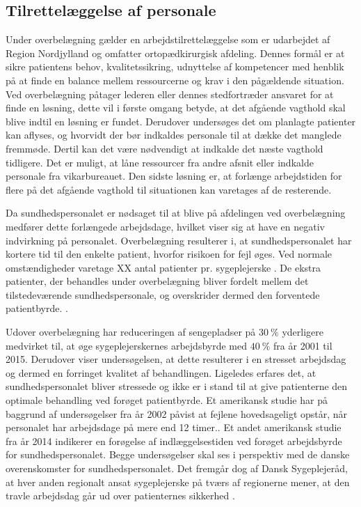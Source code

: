 \subsection{Tilrettelæggelse af personale}
Under overbelægning gælder en arbejdstilrettelæggelse som er udarbejdet af Region Nordjylland og omfatter ortopædkirurgisk afdeling. Dennes formål er at sikre patientens behov, kvalitetssikring, udnyttelse af kompetencer med henblik på at finde en balance mellem ressourcerne og krav i den pågældende situation. Ved overbelægning påtager lederen eller dennes stedfortræder ansvaret for at finde en løsning, dette vil i første omgang betyde, at det afgående vagthold skal blive indtil en løsning er fundet. Derudover undersøges det om planlagte patienter kan aflyses, og hvorvidt der bør indkaldes personale til at dække det manglede fremmøde. Dertil kan det være nødvendigt at indkalde det næste vagthold tidligere. Det er muligt, at låne ressourcer fra andre afsnit eller indkalde personale fra vikarbureauet. Den sidste løsning er, at forlænge arbejdstiden for flere på det afgående vagthold til situationen kan varetages af de resterende. \cite{Bjerg2016}


Da sundhedspersonalet er nødsaget til at blive på afdelingen ved overbelægning medfører dette forlængede arbejdsdage, hvilket viser sig at have en negativ indvirkning på personalet.\cite{Kjeldsen2015} \cite{Dinges2004} Overbelægning resulterer i, at sundhedspersonalet har kortere tid til den enkelte patient, hvorfor risikoen for fejl øges. \cite{Dinges2004} Ved normale omstændigheder varetage XX antal patienter pr. sygeplejerske . De ekstra patienter, der behandles under overbelægning bliver fordelt mellem det tilstedeværende sundhedspersonale, og overskrider dermed den forventede patientbyrde. . 


Udover overbelægning har reduceringen af sengepladser på $30~\%$ yderligere medvirket til, at øge sygeplejerskernes arbejdsbyrde med $40~\%$ fra år 2001 til 2015. Derudover viser undersøgelsen, at dette resulterer i en stresset arbejdsdag og dermed en forringet kvalitet af behandlingen.\cite{Kjeldsen2015} Ligeledes erfares det, at sundhedspersonalet bliver stressede og ikke er i stand til at give patienterne den optimale behandling ved forøget patientbyrde. \cite{Aiken2002} Et amerikansk studie har på baggrund af undersøgelser fra år 2002 påvist at fejlene hovedsageligt opstår, når personalet har arbejdsdage på mere end 12 timer.\cite{Dinges2004}. Et andet amerikansk studie fra år 2014 indikerer en forøgelse af indlæggelsestiden ved forøget arbejdsbyrde for sundhedspersonalet\cite{Elliott2014}. Begge undersøgelser skal ses i perspektiv med de danske overenskomster for sundhedspersonalet. Det fremgår dog af Dansk Sygeplejeråd, at hver anden regionalt ansat sygeplejerske på tværs af regionerne mener, at den travle arbejdsdag går ud over patienternes sikkerhed \cite{Kjeldsen2015}. 


